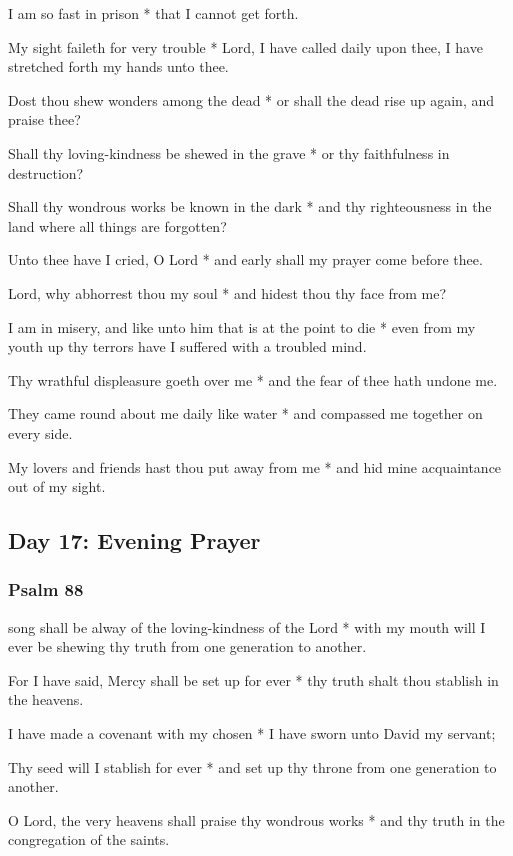 I am so fast in prison * that I cannot get forth.

My sight faileth for very trouble * Lord, I have called daily upon thee, I have stretched forth my hands unto thee.

Dost thou shew wonders among the dead * or shall the dead rise up again, and praise thee?

Shall thy loving-kindness be shewed in the grave * or thy faithfulness in destruction?

Shall thy wondrous works be known in the dark * and thy righteousness in the land where all things are forgotten?

Unto thee have I cried, O Lord * and early shall my prayer come before thee.

Lord, why abhorrest thou my soul * and hidest thou thy face from me?

I am in misery, and like unto him that is at the point to die * even from my youth up thy terrors have I suffered with a troubled mind.

Thy wrathful displeasure goeth over me * and the fear of thee hath undone me.

They came round about me daily like water * and compassed me together on every side.

My lovers and friends hast thou put away from me * and hid mine acquaintance out of my sight.

\subsection{Day 17: Evening Prayer}

\subsubsection{Psalm 88}


 song shall be alway of the loving-kindness of the Lord * with my mouth will I ever be shewing thy truth from one generation to another.

For I have said, Mercy shall be set up for ever * thy truth shalt thou stablish in the heavens.

I have made a covenant with my chosen * I have sworn unto David my servant;

Thy seed will I stablish for ever * and set up thy throne from one generation to another.

O Lord, the very heavens shall praise thy wondrous works * and thy truth in the congregation of the saints.

